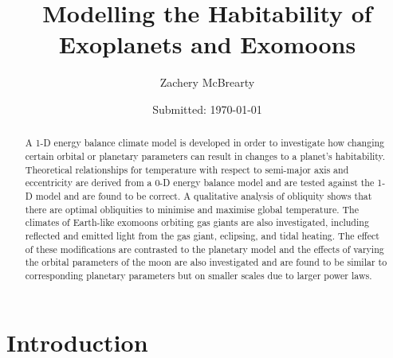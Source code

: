 \documentclass[12pt, onecolumn]{revtex4-2}    %
\begin{document}
\title{Modelling the Habitability of Exoplanets and Exomoons}
\date{Submitted: \today{}}
\author{Zachery McBrearty}

\begin{abstract}
  A 1-D energy balance climate model is developed in order to investigate how changing certain orbital or planetary parameters can result in changes to a planet's habitability.
  Theoretical relationships for temperature with respect to semi-major axis and eccentricity are derived from a 0-D energy balance model and are tested against the 1-D model and are found to be correct.
  A qualitative analysis of obliquity shows that there are optimal obliquities to minimise and maximise global temperature.
  The climates of Earth-like exomoons orbiting gas giants are also investigated, including reflected and emitted light from the gas giant, eclipsing, and tidal heating.
  The effect of these modifications are contrasted to the planetary model and the effects of varying the orbital parameters of the moon are also investigated and are found to be similar to corresponding planetary parameters but on smaller scales due to larger power laws.
\end{abstract}


\maketitle


\tableofcontents



\section{Introduction} \label{sec:Introduction} %
%
\end{document}
